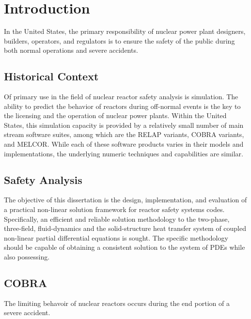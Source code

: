 \chapter{Introduction}
In the United States, the primary responsibility of nuclear power plant designers, builders, operators, and regulators is to ensure the safety of the public during both normal operations and severe accidents.


\section{Historical Context}
Of primary use in the field of nuclear reactor safety analysis is simulation.
The ability to predict the behavior of reactors during off-normal events is the key to the licensing and the operation of nuclear power plants.
Within the United States, this simulation capacity is provided by a relatively small number of main stream software suites, among which are the RELAP variants, COBRA variants, and MELCOR.
While each of these software products varies in their models and implementations, the underlying numeric techniques and capabilities are similar.

\section{Safety Analysis}
The objective of this dissertation is the design, implementation, and evaluation of a practical non-linear solution framework for reactor safety systems codes.
Specifically, an efficient and reliable solution methodology to the two-phase, three-field, fluid-dynamics and the solid-structure heat transfer system of coupled non-linear partial differential equations is sought.
The specific methodology should be capable of obtaining a consistent solution to the system of PDEs while also possessing. \cite{Aktas1996}

\section{COBRA}
The limiting behavoir of nuclear reactors occurs during the end portion of a severe accident.